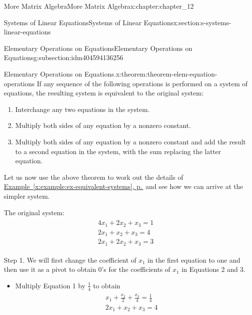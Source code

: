 \documentclass[twoside,10pt,]{book}
\newcommand{\xreffont}{\relax}
\numberwithin{equation}{section}
\begin{document}
\begin{chapterptx}{More Matrix Algebra}{}{More Matrix Algebra}{}{}{x:chapter:chapter_12}
\begin{sectionptx}{Systems of Linear Equations}{}{Systems of Linear Equations}{}{}{x:section:s-systems-linear-equations}
%
%
\typeout{************************************************}
\typeout{************************************************}
%
\begin{subsectionptx}{Elementary Operations on Equations}{}{Elementary Operations on Equations}{}{}{g:subsection:idm404594136256}
\begin{theorem}{Elementary Operations on Equations.}{}{x:theorem:theorem-elem-equation-operations}%
%
If any sequence of the following operations is performed on a system of equations, the resulting system is equivalent to the original system:%
\begin{enumerate}[label=(\alph*)]
\item{}Interchange any two equations in the system.%
\item{}Multiply both sides of any equation by a nonzero constant.%
\item{}Multiply both sides of any equation by a nonzero constant and add the result to a second equation in the system, with the sum replacing the latter equation.%
\end{enumerate}
%
\end{theorem}
Let us now use the above theorem to work out the details of \hyperref[x:example:ex-equivalent-systems]{Example~{\xreffont\ref{x:example:ex-equivalent-systems}}, p.\,\pageref{x:example:ex-equivalent-systems}} and see how we can arrive at the simpler system.%
\par
The original system:%
\begin{gather}
\begin{array}{c}
4 x_1+2 x_2+x_3=1 \\ 
2 x_1+x_2+x_3=4 \\
2 x_1+2 x_2+x_3=3
\end{array}\label{g:mrow:idm404594127536}
\end{gather}
%
\par
Step 1. We will first change the coefficient of \(x_1\) in the first equation to one and then use it as a pivot to obtain 0's for the coefficients of \(x_1\) in Equations 2 and 3.%
\begin{itemize}[label=\textbullet]
\item{}Multiply Equation 1 by \(\frac{1}{4}\) to obtain%
\begin{gather}
\begin{array}{c}
x_1+\frac{x_2}{2}+\frac{x_3}{4}=\frac{1}{4}\\
2 x_1+x_2+x_3=4 \\

\end{array}
\end{gather}
\end{itemize}
\end{subsectionptx}
\end{sectionptx}
\end{chapterptx}
\end{document}
